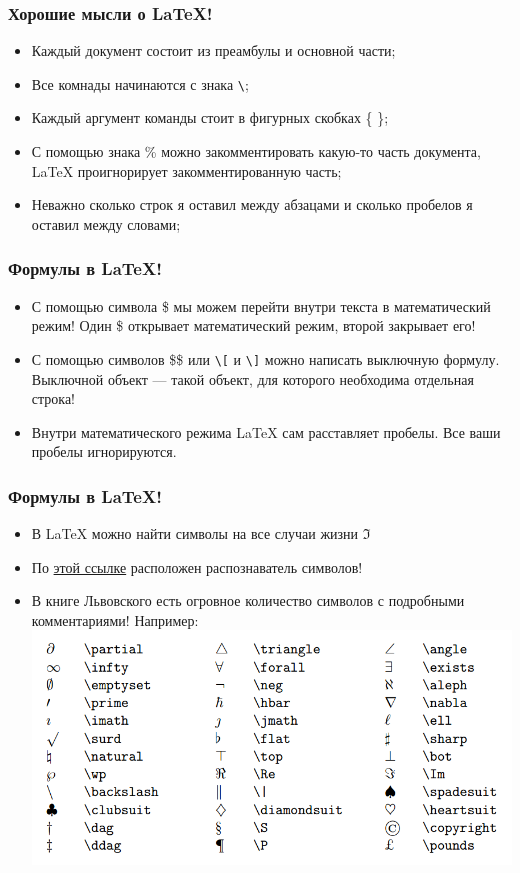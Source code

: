 \documentclass[newPxFont]{beamer}
\begin{document}
\begin{frame}[fragile]
\frametitle{Хорошие мысли о \LaTeX!} 
\begin{itemize}
\item Каждый документ состоит из преамбулы и основной части;
\item Все {\color{green} комнады} начинаются с знака \verb|\|;
\item Каждый аргумент команды стоит в фигурных скобках \{ \};
\item С помощью знака \% можно закомментировать какую-то часть документа, \LaTeX{} проигнорирует закомментированную часть;
\item Неважно сколько строк я оставил между абзацами и сколько пробелов я оставил между словами; 
\end{itemize}
\end{frame}


\begin{frame}[fragile]
\frametitle{Формулы в \LaTeX!} 
\begin{itemize}
\item С помощью символа \$ мы можем перейти внутри текста в математический режим! Один \$ открывает математический режим, второй закрывает его! 
\item С помощью символов \$\$ или \verb|\[| и \verb|\]| можно написать выключную формулу. Выключной объект --- такой объект, для которого необходима отдельная строка!
\item Внутри математического режима \LaTeX{} сам расставляет пробелы. Все ваши пробелы игнорируются.
\end{itemize}
\end{frame}


\begin{frame}
\frametitle{Формулы в \LaTeX!} 
\begin{itemize}
\item В \LaTeX{} можно найти символы на все случаи жизни $\Im$
\item По {\color{blue} \href{http://detexify.kirelabs.org/classify.html}{этой ссылке}} расположен распознаватель символов!
\item В книге Львовского есть огровное количество символов с подробными комментариями! Например: 
\centering  \includegraphics[scale=0.2]{table.png}
\end{itemize}
\end{frame}
\end{document}
